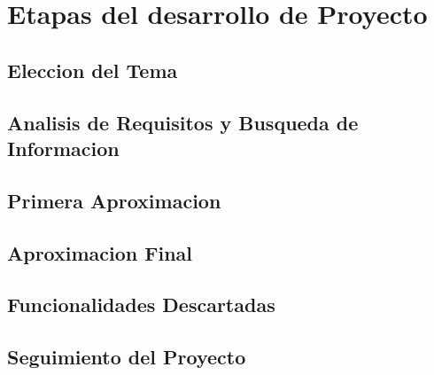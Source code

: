 \chapter{Etapas del desarrollo de Proyecto}

\section{Eleccion del Tema}

\section{Analisis de Requisitos y Busqueda de Informacion}

\section{Primera Aproximacion}

\section{Aproximacion Final}

\section{Funcionalidades Descartadas}

\section{Seguimiento del Proyecto}



